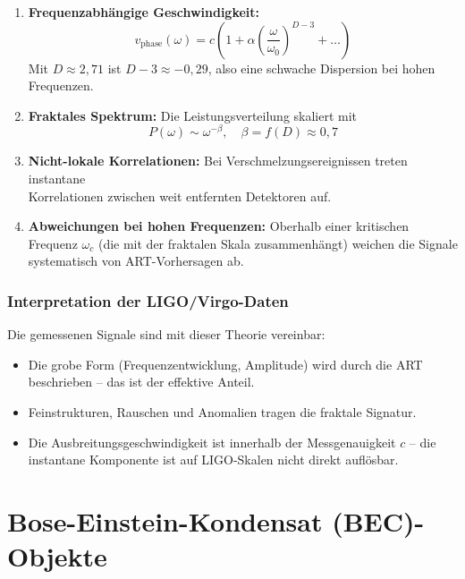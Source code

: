 \documentclass[12pt,a4paper]{article}
\begin{document}
\begin{enumerate}
\item \textbf{Frequenzabhängige Geschwindigkeit:}
\begin{equation}
v_{\text{phase}}(\omega) = c \left( 1 + \alpha \left( \frac{\omega}{\omega_0} \right)^{D-3} + \dots \right)
\end{equation}
Mit $D \approx 2,71$ ist $D-3 \approx -0,29$, also eine schwache Dispersion bei hohen Frequenzen.

\item \textbf{Fraktales Spektrum:} Die Leistungsverteilung skaliert mit
\begin{equation}
P(\omega) \sim \omega^{-\beta}, \quad \beta = f(D) \approx 0,7
\end{equation}

\item \textbf{Nicht-lokale Korrelationen:} Bei Verschmelzungsereignissen treten instantane\\Korrelationen zwischen weit entfernten Detektoren auf.

\item \textbf{Abweichungen bei hohen Frequenzen:} Oberhalb einer kritischen Frequenz $\omega_c$ (die mit der fraktalen Skala zusammenhängt) weichen die Signale systematisch von ART-Vorhersagen ab.
\end{enumerate}

\subsubsection{Interpretation der LIGO/Virgo-Daten}

Die gemessenen Signale sind mit dieser Theorie vereinbar:
\begin{itemize}
\item Die grobe Form (Frequenzentwicklung, Amplitude) wird durch die ART beschrieben -- das ist der effektive Anteil.
\item Feinstrukturen, Rauschen und Anomalien tragen die fraktale Signatur.
\item Die Ausbreitungsgeschwindigkeit ist innerhalb der Messgenauigkeit $c$ -- die instantane Komponente ist auf LIGO-Skalen nicht direkt auflösbar.
\end{itemize}

\section{Bose-Einstein-Kondensat (BEC)-Objekte}
\end{document}

